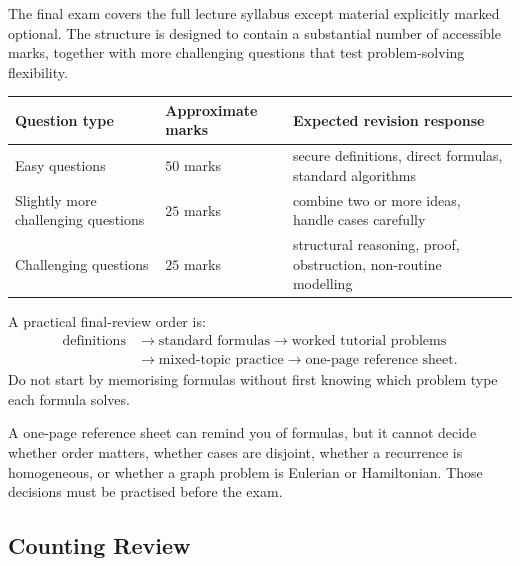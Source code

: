 The final exam covers the full lecture syllabus except material explicitly marked optional. The structure is designed to contain a substantial number of accessible marks, together with more challenging questions that test problem-solving flexibility.

\begin{center}
\small
\begin{tabular}{@{}p{}p{}p{}@{}}
\toprule
\textbf{Question type} & \textbf{Approximate marks} & \textbf{Expected revision response} \\
\midrule
Easy questions & \(50\) marks & secure definitions, direct formulas, standard algorithms \\
Slightly more challenging questions & \(25\) marks & combine two or more ideas, handle cases carefully \\
Challenging questions & \(25\) marks & structural reasoning, proof, obstruction, non-routine modelling \\
\bottomrule
\end{tabular}
\end{center}

\begin{examtip}[title={Efficient exam-preparation order}]
A practical final-review order is:
\[
\begin{aligned}
\text{definitions}&\longrightarrow\text{standard formulas}
\longrightarrow\text{worked tutorial problems}\\
&\longrightarrow\text{mixed-topic practice}
\longrightarrow\text{one-page reference sheet}.
\end{aligned}
\]
Do not start by memorising formulas without first knowing which problem type each formula solves.
\end{examtip}

\begin{commonmistake}[title={Treating the reference sheet as a substitute for reasoning}]
A one-page reference sheet can remind you of formulas, but it cannot decide whether order matters, whether cases are disjoint, whether a recurrence is homogeneous, or whether a graph problem is Eulerian or Hamiltonian. Those decisions must be practised before the exam.
\end{commonmistake}

\subsection{Counting Review}

